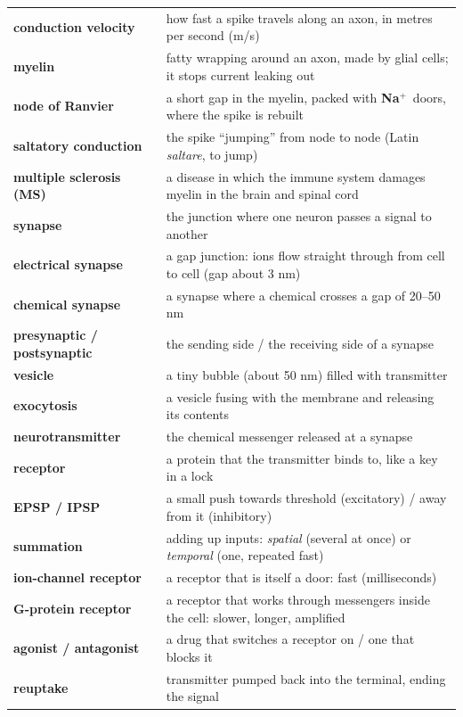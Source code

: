 \documentclass[12pt,a4paper]{article}
\newcommand{\Na}{\textcolor{cNa}{\textbf{Na$^{+}$}}}
\begin{document}
{\renewcommand{\arraystretch}{1.22}\small
\begin{tabular}{@{}>{\bfseries}p{4.4cm}p{12cm}@{}}
\toprule
conduction velocity & how fast a spike travels along an axon, in metres per second (m/s)\\
myelin & fatty wrapping around an axon, made by glial cells; it stops current leaking out\\
node of Ranvier & a short gap in the myelin, packed with \Na\ doors, where the spike is rebuilt\\
saltatory conduction & the spike ``jumping'' from node to node (Latin \emph{saltare}, to jump)\\
multiple sclerosis (MS) & a disease in which the immune system damages myelin in the brain and spinal cord\\
synapse & the junction where one neuron passes a signal to another\\
electrical synapse & a gap junction: ions flow straight through from cell to cell (gap about 3 nm)\\
chemical synapse & a synapse where a chemical crosses a gap of 20--50 nm\\
presynaptic / postsynaptic & the sending side / the receiving side of a synapse\\
vesicle & a tiny bubble (about 50 nm) filled with transmitter\\
exocytosis & a vesicle fusing with the membrane and releasing its contents\\
neurotransmitter & the chemical messenger released at a synapse\\
receptor & a protein that the transmitter binds to, like a key in a lock\\
EPSP / IPSP & a small push towards threshold (excitatory) / away from it (inhibitory)\\
summation & adding up inputs: \emph{spatial} (several at once) or \emph{temporal} (one, repeated fast)\\
ion-channel receptor & a receptor that is itself a door: fast (milliseconds)\\
G-protein receptor & a receptor that works through messengers inside the cell: slower, longer, amplified\\
agonist / antagonist & a drug that switches a receptor on / one that blocks it\\
reuptake & transmitter pumped back into the terminal, ending the signal\\
\bottomrule
\end{tabular}}
\end{document}
